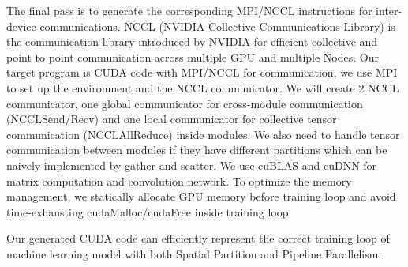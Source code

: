 \documentclass[sigplan]{acmart}\settopmatter{printfolios=true,printccs=false,printacmref=false}
\begin{document}
 The final pass is to generate the corresponding MPI/NCCL instructions for inter-device communications. NCCL (NVIDIA Collective Communications Library) is the communication library introduced by NVIDIA for efficient collective and point to point communication across multiple GPU and multiple Nodes. Our target program is CUDA code with MPI/NCCL for communication, we use MPI to set up the environment and the NCCL communicator. We will create 2 NCCL communicator, one global communicator for cross-module communication (NCCLSend/Recv) and one local communicator for collective tensor communication (NCCLAllReduce) inside modules. We also need to handle tensor communication between modules if they have different partitions which can be naively implemented by gather and scatter. We use cuBLAS and cuDNN for matrix computation and convolution network. To optimize the memory management, we statically allocate GPU memory before training loop and avoid time-exhausting cudaMalloc/cudaFree inside training loop. \par
 Our generated CUDA code can efficiently represent the correct training loop of machine learning model with both Spatial Partition and Pipeline Parallelism.
\end{document}
